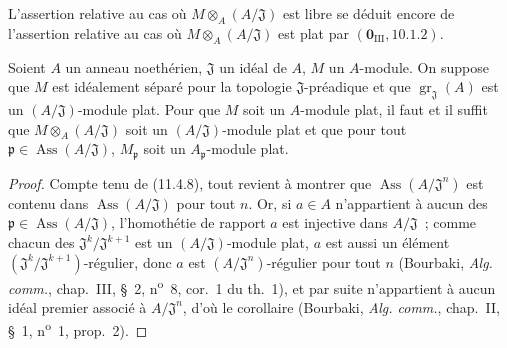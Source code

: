 
L'assertion relative au cas où $M\otimes_A(A/\mathfrak J)$ est libre se déduit
encore de l'assertion relative au cas où $M\otimes_A(A/\mathfrak J)$ est plat
par $(\mathbf 0_{\mathrm{III}},10.1.2)$.

\begin{corollary}[11.4.10]
\label{IV.11.4.10-fr}
Soient $A$ un anneau noethérien, $\mathfrak J$ un idéal de $A$, $M$ un
$A$-module. On suppose que $M$ est idéalement séparé pour la topologie
$\mathfrak J$-préadique et que $\operatorname{gr}_{\mathfrak J}(A)$ est un
$(A/\mathfrak J)$-module plat. Pour que $M$ soit un $A$-module plat, il faut et
il suffit que $M\otimes_A(A/\mathfrak J)$ soit un $(A/\mathfrak J)$-module plat
et que pour tout $\mathfrak p\in\operatorname{Ass}(A/\mathfrak J)$,
$M_{\mathfrak p}$ soit un $A_{\mathfrak p}$-module plat.
\end{corollary}

\begin{proof}
Compte tenu de (11.4.8), tout revient à montrer que
$\operatorname{Ass}(A/\mathfrak J^n)$ est contenu dans
$\operatorname{Ass}(A/\mathfrak J)$ pour tout $n$. Or, si $a\in A$ n'appartient
à aucun des $\mathfrak p\in\operatorname{Ass}(A/\mathfrak J)$, l'homothétie de
rapport $a$ est injective dans $A/\mathfrak J$~; comme chacun des
$\mathfrak J^k/\mathfrak J^{k+1}$ est un $(A/\mathfrak J)$-module plat, $a$ est
aussi un élément $(\mathfrak J^k/\mathfrak J^{k+1})$-régulier, donc $a$ est
$(A/\mathfrak J^n)$-régulier pour tout $n$ (Bourbaki, \emph{Alg. comm.},
chap.~III, \S~2, n\textsuperscript{o}~8, cor.~1 du th.~1), et par suite n'appartient à
aucun idéal premier associé à $A/\mathfrak J^n$, d'où le corollaire (Bourbaki,
\emph{Alg. comm.}, chap.~II, \S~1, n\textsuperscript{o}~1, prop.~2).
\end{proof}

